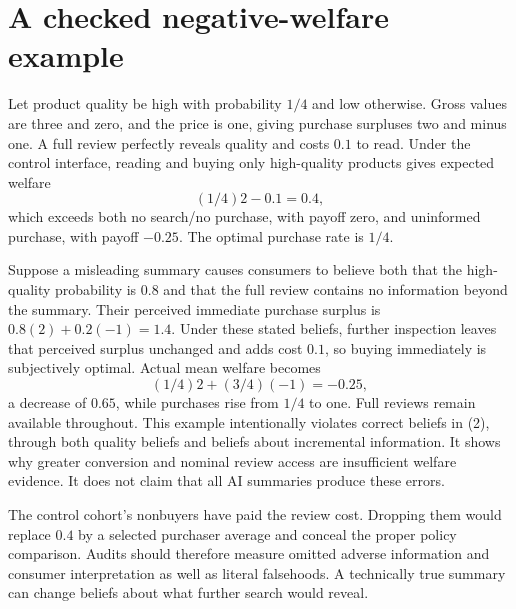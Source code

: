 \documentclass[11pt]{article}
\begin{document}
\section{A checked negative-welfare example}
Let product quality be high with probability $1/4$ and low otherwise.
Gross values are three and zero, and the price is one, giving purchase
surpluses two and minus one. A full review perfectly reveals quality and
costs $0.1$ to read. Under the control interface, reading and buying only
high-quality products gives expected welfare
\[
 (1/4)2-0.1=0.4,
\]
which exceeds both no search/no purchase, with payoff zero, and uninformed
purchase, with payoff $-0.25$. The optimal purchase rate is $1/4$.

Suppose a misleading summary causes consumers to believe both that the
high-quality probability is $0.8$ and that the full review contains no
information beyond the summary. Their perceived immediate purchase
surplus is $0.8(2)+0.2(-1)=1.4$. Under these stated beliefs, further
inspection leaves that perceived surplus unchanged and adds cost $0.1$,
so buying immediately is subjectively optimal. Actual mean welfare becomes
\[
 (1/4)2+(3/4)(-1)=-0.25,
\]
a decrease of $0.65$, while purchases rise from $1/4$ to one. Full reviews
remain available throughout. This example intentionally violates correct
beliefs in (2), through both quality beliefs and beliefs about incremental
information. It shows why greater conversion and nominal review access
are insufficient welfare evidence. It does not claim that all AI summaries
produce these errors.

The control cohort's nonbuyers have paid the review cost. Dropping them
would replace $0.4$ by a selected purchaser average and conceal the proper
policy comparison. Audits should therefore measure omitted adverse
information and consumer interpretation as well as literal falsehoods.
A technically true summary can change beliefs about what further search
would reveal.
\end{document}
